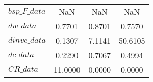 \begin{center}
\begin{longtable}{lccc}
$bsp\_F\_data               $	 & 	          NaN	 & 	          NaN	 & 	          NaN \\ 
$dw\_data                   $	 & 	       0.7701	 & 	       0.8701	 & 	       0.7570 \\ 
$dinve\_data                $	 & 	       0.1307	 & 	       7.1141	 & 	      50.6105 \\ 
$dc\_data                   $	 & 	       0.2290	 & 	       0.7067	 & 	       0.4994 \\ 
$CR\_data                   $	 & 	      11.0000	 & 	       0.0000	 & 	       0.0000 \\ 
\end{longtable}
 \end{center}
